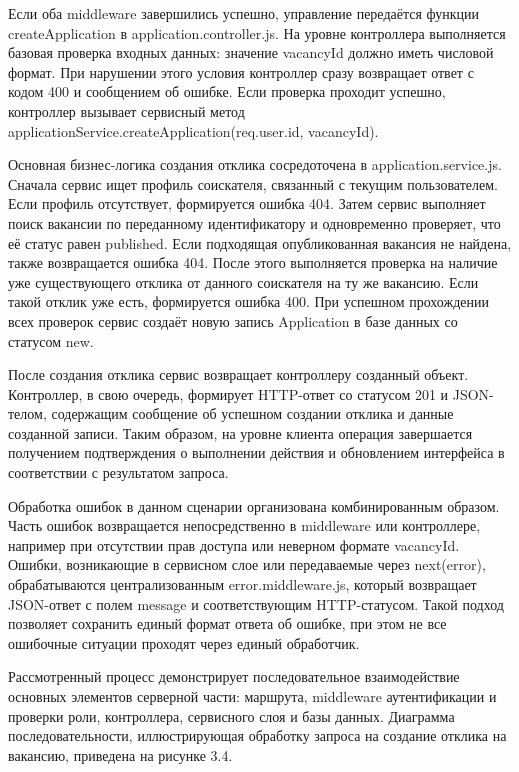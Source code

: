 Если оба middleware завершились успешно, управление передаётся функции createApplication в application.controller.js. На уровне контроллера выполняется базовая проверка входных данных: значение vacancyId должно иметь числовой формат. При нарушении этого условия контроллер сразу возвращает ответ с кодом 400 и сообщением об ошибке. Если проверка проходит успешно, контроллер вызывает сервисный метод applicationService.createApplication(req.user.id, vacancyId).

Основная бизнес-логика создания отклика сосредоточена в application.service.js. Сначала сервис ищет профиль соискателя, связанный с текущим пользователем. Если профиль отсутствует, формируется ошибка 404. Затем сервис выполняет поиск вакансии по переданному идентификатору и одновременно проверяет, что её статус равен published. Если подходящая опубликованная вакансия не найдена, также возвращается ошибка 404. После этого выполняется проверка на наличие уже существующего отклика от данного соискателя на ту же вакансию. Если такой отклик уже есть, формируется ошибка 400. При успешном прохождении всех проверок сервис создаёт новую запись Application в базе данных со статусом new.

После создания отклика сервис возвращает контроллеру созданный объект. Контроллер, в свою очередь, формирует HTTP-ответ со статусом 201 и JSON-телом, содержащим сообщение об успешном создании отклика и данные созданной записи. Таким образом, на уровне клиента операция завершается получением подтверждения о выполнении действия и обновлением интерфейса в соответствии с результатом запроса.

Обработка ошибок в данном сценарии организована комбинированным образом. Часть ошибок возвращается непосредственно в middleware или контроллере, например при отсутствии прав доступа или неверном формате vacancyId. Ошибки, возникающие в сервисном слое или передаваемые через next(error), обрабатываются централизованным error.middleware.js, который возвращает JSON-ответ с полем message и соответствующим HTTP-статусом. Такой подход позволяет сохранить единый формат ответа об ошибке, при этом не все ошибочные ситуации проходят через единый обработчик.

Рассмотренный процесс демонстрирует последовательное взаимодействие основных элементов серверной части: маршрута, middleware аутентификации и проверки роли, контроллера, сервисного слоя и базы данных. Диаграмма последовательности, иллюстрирующая обработку запроса на создание отклика на вакансию, приведена на рисунке 3.4.

